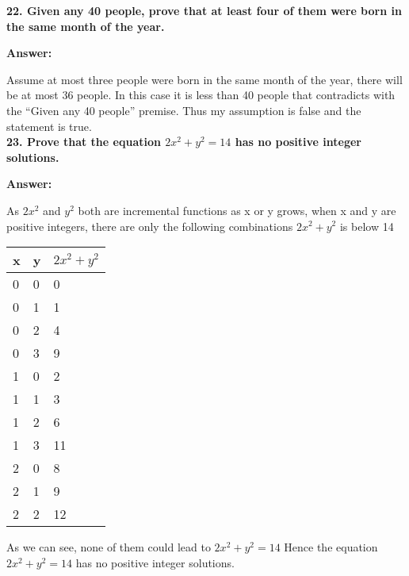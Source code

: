 \documentclass{article}
\begin{document}
\begin{large}
\textbf{22. Given any 40 people, prove that at least four of them were born in the same month of the year.}

\textbf{Answer:}

Assume at most three people were born in the same month of the year, there will be at most 36 people. In this case it is less than 40 people that contradicts with the ``Given any 40 people'' premise. 
Thus my assumption is false and the statement is true.\\

\textbf{23. Prove that the equation $2x^2+y^2=14$ has no positive integer solutions.}

\textbf{Answer:}

As $2x^2$ and $y^2$ both are incremental functions as x or y grows,
when x and y are positive integers, there are only the following combinations $2x^2 + y^2$ is below 14

\begin{tabular} {   | p{3cm}  |  p{3cm} |  p{4cm}  |}
\hline
x & y & $2x^2 + y^2$ \\
\hline
0 & 0 &  0\\
\hline
0  &1 &  1\\
\hline
0 & 2&   4 \\
\hline
0  &3 &  9 \\
\hline
1  & 0  & 2 \\
\hline
1 & 1 &  3 \\
\hline
1&  2  & 6  \\
\hline
1 & 3 & 11 \\
\hline
2 & 0 &  8 \\
\hline
2 & 1 &  9 \\
\hline
2 & 2&  12 \\
\hline
\end{tabular}

As we can see, none of them could lead to $2x^2+y^2=14$
Hence the equation $2x^2+y^2=14$ has no positive integer solutions.


\end{large}
\end{document}
